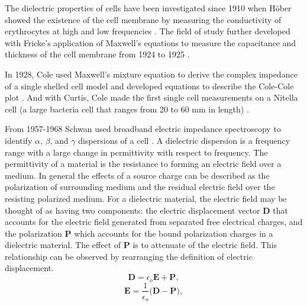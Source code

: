  
 \par The dielectric properties of cells have been investigated since 1910 when H\"{o}ber showed the existence of the cell membrane by measuring the conductivity of erythrocytes at high and low frequencies \cite{hober_r_methode_1910}. The field of study further developed with Fricke's application of Maxwell's equations to measure the capacitance and thickness of the cell membrane from 1924 to 1925 \cite{james_clerk_maxwell_treatise_1892, fricke_h_mathematical_1924, fricke_h_electric_1924, fricke_h_electric_1931}. 
 
 \par In 1928, Cole used Maxwell's mixture equation to derive the complex impedance of a single shelled cell model and developed equations to describe the Cole-Cole plot \cite{cole_electric_1928}. And with Curtis, Cole made the first single cell measurements on a Nitella cell (a large bacteria cell that ranges from 20 to 60 mm in length) \cite{curtis_transverse_1937}. 
 
 \par From 1957-1968 Schwan used broadband electric impedance spectroscopy to identify $\alpha$, $\beta$, and $\gamma$ dispersions of a cell \cite{schwan_h_p_electrical_1957,schwan_h_p_electrical_1963,schwan_electrical_1994}. A dielectric dispersion is a frequency range with a large change in permittivity with respect to frequency. The permittivity of a material is the resistance to forming an electric field over a medium. In general the effects of a source charge can be described as the polarization of surrounding medium and the residual electric field over the resisting polarized medium. For a dielectric material, the electric field may be thought of as having two components: the electric displacement vector $\boldsymbol{D}$ that accounts for the electric field generated from separated free electrical charges, and the polarization $\boldsymbol{P}$ which accounts for the bound polarization charges in a dielectric material. The effect of $\boldsymbol{P}$ is to attenuate of the electric field. This relationship can be observed by rearranging the definition of electric displacement.
 \begin{equation}
     \boldsymbol{D} = \epsilon_o \boldsymbol{E} + \boldsymbol{P},
     \label{eqn:electric_displacement}
 \end{equation}
 \begin{equation}
    \boldsymbol{E} = \frac{1}{\epsilon_o}\Big(\boldsymbol{D} - \boldsymbol{P}\Big),
 \end{equation}
 
